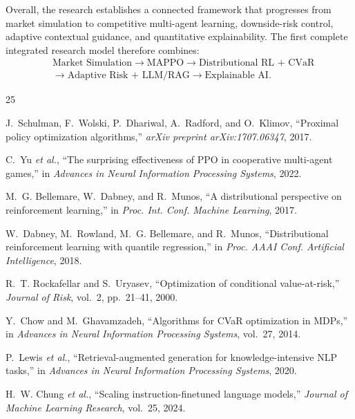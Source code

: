 \documentclass[conference]{IEEEtran}
\begin{document}
Overall, the research establishes a connected framework that progresses from market simulation to competitive multi-agent learning, downside-risk control, adaptive contextual guidance, and quantitative explainability. The first complete integrated research model therefore combines:
\begin{equation*}
\begin{aligned}
&\text{Market Simulation} \rightarrow \text{MAPPO} \rightarrow \text{Distributional RL + CVaR}\\
&\rightarrow \text{Adaptive Risk + LLM/RAG} \rightarrow \text{Explainable AI}.
\end{aligned}
\end{equation*}

\begin{thebibliography}{25}

J.~Schulman, F.~Wolski, P.~Dhariwal, A.~Radford, and O.~Klimov, ``Proximal policy optimization algorithms,'' \emph{arXiv preprint arXiv:1707.06347}, 2017.

C.~Yu \emph{et al.}, ``The surprising effectiveness of PPO in cooperative multi-agent games,'' in \emph{Advances in Neural Information Processing Systems}, 2022.

M.~G. Bellemare, W.~Dabney, and R.~Munos, ``A distributional perspective on reinforcement learning,'' in \emph{Proc. Int. Conf. Machine Learning}, 2017.

W.~Dabney, M.~Rowland, M.~G. Bellemare, and R.~Munos, ``Distributional reinforcement learning with quantile regression,'' in \emph{Proc. AAAI Conf. Artificial Intelligence}, 2018.

R.~T. Rockafellar and S.~Uryasev, ``Optimization of conditional value-at-risk,'' \emph{Journal of Risk}, vol.~2, pp.~21--41, 2000.

Y.~Chow and M.~Ghavamzadeh, ``Algorithms for CVaR optimization in MDPs,'' in \emph{Advances in Neural Information Processing Systems}, vol.~27, 2014.

P.~Lewis \emph{et al.}, ``Retrieval-augmented generation for knowledge-intensive NLP tasks,'' in \emph{Advances in Neural Information Processing Systems}, 2020.

H.~W. Chung \emph{et al.}, ``Scaling instruction-finetuned language models,'' \emph{Journal of Machine Learning Research}, vol.~25, 2024.


\end{thebibliography}
\end{document}
